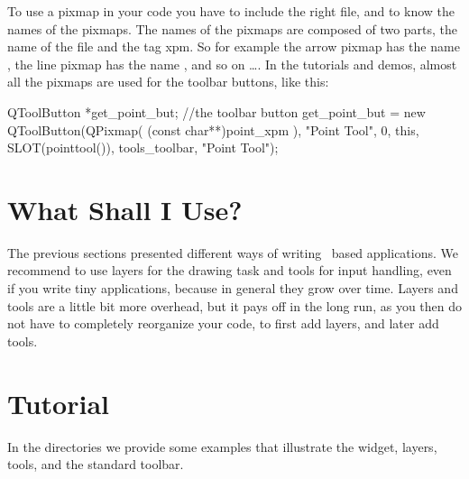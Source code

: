 











To use a pixmap in your code you have to include the right file, and
to know the names of the pixmaps. The names of the pixmaps are
composed of two parts, the name of the file and the tag xpm. So for
example the arrow pixmap has the name , the line
pixmap has the name , and so on \ldots.  In the
tutorials and demos, almost all the pixmaps are used for the toolbar
buttons, like this:

\ccExample
\begin{ccExampleCode}
    QToolButton *get_point_but; //the toolbar button
    get_point_but =  new QToolButton(QPixmap( (const char**)point_xpm ),
                                     "Point Tool", 
                                     0, 
                                     this, 
                                     SLOT(pointtool()), 
                                     tools_toolbar, 
                                     "Point Tool");
\end{ccExampleCode}



\section{What Shall I Use?}

The previous sections presented different ways of writing \qt\ based 
applications. We recommend to use layers for the drawing task and tools
for input handling, even if you write tiny applications, because in general
they grow over time.   Layers and tools are a little bit more overhead, but 
it pays off in the long run, as you then do not have to completely
reorganize your code, to first add layers, and later add tools. 





\section{Tutorial}

In the directories  we provide some examples
that illustrate the widget, layers, tools, and the standard toolbar.








